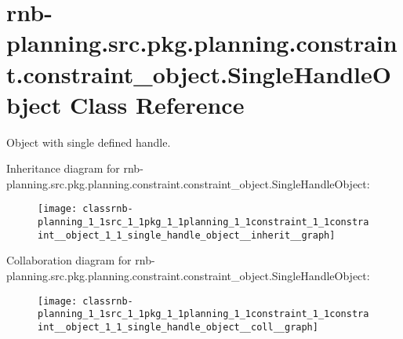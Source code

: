 \hypertarget{classrnb-planning_1_1src_1_1pkg_1_1planning_1_1constraint_1_1constraint__object_1_1_single_handle_object}{}\section{rnb-\/planning.src.\+pkg.\+planning.\+constraint.\+constraint\+\_\+object.\+Single\+Handle\+Object Class Reference}
\label{classrnb-planning_1_1src_1_1pkg_1_1planning_1_1constraint_1_1constraint__object_1_1_single_handle_object}


Object with single defined handle.  




Inheritance diagram for rnb-\/planning.src.\+pkg.\+planning.\+constraint.\+constraint\+\_\+object.\+Single\+Handle\+Object\+:
\nopagebreak
\begin{figure}[H]
\begin{center}
\leavevmode
\texttt{[image: classrnb-planning\_1\_1src\_1\_1pkg\_1\_1planning\_1\_1constraint\_1\_1constraint\_\_object\_1\_1\_single\_handle\_object\_\_inherit\_\_graph]}
\end{center}
\end{figure}


Collaboration diagram for rnb-\/planning.src.\+pkg.\+planning.\+constraint.\+constraint\+\_\+object.\+Single\+Handle\+Object\+:
\nopagebreak
\begin{figure}[H]
\begin{center}
\leavevmode
\texttt{[image: classrnb-planning\_1\_1src\_1\_1pkg\_1\_1planning\_1\_1constraint\_1\_1constraint\_\_object\_1\_1\_single\_handle\_object\_\_coll\_\_graph]}
\end{center}
\end{figure}
